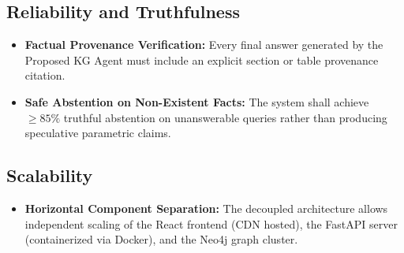 \subsection{Reliability and Truthfulness}
\begin{itemize}
    \item \textbf{Factual Provenance Verification:} Every final answer generated by the Proposed KG Agent must include an explicit section or table provenance citation.
    \item \textbf{Safe Abstention on Non-Existent Facts:} The system shall achieve $\ge 85\%$ truthful abstention on unanswerable queries rather than producing speculative parametric claims.
\end{itemize}

\subsection{Scalability}
\begin{itemize}
    \item \textbf{Horizontal Component Separation:} The decoupled architecture allows independent scaling of the React frontend (CDN hosted), the FastAPI server (containerized via Docker), and the Neo4j graph cluster.
\end{itemize}

